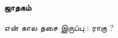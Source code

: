 \documentclass[20pt]{extarticle}
\begin{document}
\begin{center}
    \Huge \textbf{ஜாதகம்}
\end{center}

\vspace{1cm}

என் கால தசை இருப்பு : ராகு ?
\end{document}
